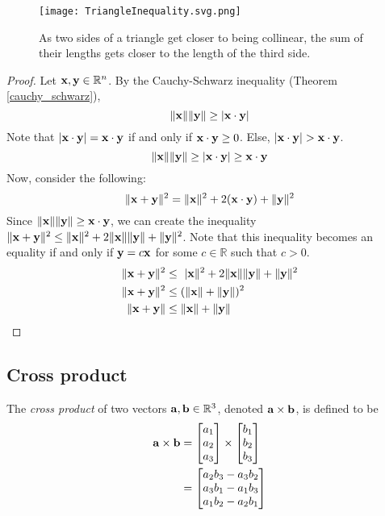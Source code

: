 \documentclass[../main.tex]{subfiles}
\begin{document}
\begin{figure}[H]
	\centering
	\texttt{[image: TriangleInequality.svg.png]}
	\caption{As two sides of a triangle get closer to being collinear,
		the sum of their lengths gets closer to the length of the third side.}
\end{figure}

\begin{proof}
	Let $\mathbf{x}, \mathbf{y} \in \mathbb{R}^n$.
	By the Cauchy-Schwarz inequality (Theorem \ref{cauchy_schwarz}),
	$$\|\mathbf{x}\|\|\mathbf{y}\|\geq |\mathbf{x}\cdot\mathbf{y}|$$
	Note that $|\mathbf{x}\cdot\mathbf{y}|=\mathbf{x}\cdot\mathbf{y}$ if and only if
	$\mathbf{x}\cdot\mathbf{y}\geq0$. Else, $|\vect{x}\cdot\vect{y}|>\vect{x}\cdot\vect{y}$.
	$$\|\mathbf{x}\|\|\mathbf{y}\|\geq |\mathbf{x}\cdot\mathbf{y}|\geq\mathbf{x}\cdot\mathbf{y}$$
	Now, consider the following:
	$$\|\mathbf{x} + \mathbf{y}\|^2  = \|\mathbf{x}\|^2+2(\mathbf{x}\cdot\mathbf{y})+\|\mathbf{y}\|^2 $$
	Since $\|\mathbf{x}\|\|\mathbf{y}\|\geq\mathbf{x}\cdot\mathbf{y}$,
	we can create the inequality $\|\mathbf{x}+\mathbf{y}\|^2\leq\|\mathbf{x}\|^2+2\|\mathbf{x}\|\|\mathbf{y}\|+\|\mathbf{y}\|^2$.
	Note that this inequality becomes an equality if and only if $\mathbf{y}=c\mathbf{x}$
	for some $c \in \mathbb{R}$ such that $c>0$.
	\begin{align*}
		\|\vect{x}+\vect{y}\|^2   & \leq\ |\vect{x}\|^2+2\|\vect{x}\|\|\vect{y}\|+\|\vect{y}\|^2 \\
		\|\vect{x} + \vect{y}\|^2 & \leq (\|\vect{x}\|+\|\vect{y}\|)^2                           \\
		\|\vect{x} + \vect{y}\|   & \leq \|\vect{x}\|+\|\vect{y}\|
	\end{align*}
\end{proof}

\subsection{Cross product}

\begin{definition}
	The \textit{cross product} of two vectors $\mathbf{a}, \mathbf{b} \in \mathbb{R}^3$,
	denoted $\mathbf{a}\times\mathbf{b}$, is defined to be
	\begin{align*}
		\mathbf{a}\times\mathbf{b} & = \begin{bmatrix}a_1\\a_2\\a_3\end{bmatrix}\times\begin{bmatrix}b_1\\b_2\\b_3\end{bmatrix} \\
		                       & = \begin{bmatrix}a_2b_3-a_3b_2\\a_3b_1-a_1b_3\\a_1b_2-a_2b_1\end{bmatrix}
	\end{align*}
\end{definition}
\end{document}
